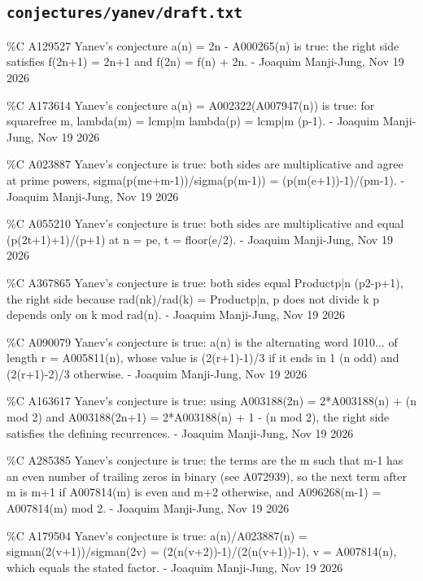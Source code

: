 \subsection*{\texttt{conjectures/yanev/draft.txt}}
{\small\raggedright\ttfamily
\%C A129527 Yanev's conjecture a(n) = 2n - A000265(n) is true: the right side satisfies f(2n+1) = 2n+1 and f(2n) = f(n) + 2n. - Joaquim Manji-Jung, Nov 19 2026\par
\%C A173614 Yanev's conjecture a(n) = A002322(A007947(n)) is true: for squarefree m, lambda(m) = lcmp|m lambda(p) = lcmp|m (p-1). - Joaquim Manji-Jung, Nov 19 2026\par
\%C A023887 Yanev's conjecture is true: both sides are multiplicative and agree at prime powers, sigma(p(me+m-1))/sigma(p(m-1)) = (p(m(e+1))-1)/(pm-1). - Joaquim Manji-Jung, Nov 19 2026\par
\%C A055210 Yanev's conjecture is true: both sides are multiplicative and equal (p(2t+1)+1)/(p+1) at n = pe, t = floor(e/2). - Joaquim Manji-Jung, Nov 19 2026\par
\%C A367865 Yanev's conjecture is true: both sides equal Productp|n (p2-p+1), the right side because rad(nk)/rad(k) = Productp|n, p does not divide k p depends only on k mod rad(n). - Joaquim Manji-Jung, Nov 19 2026\par
\%C A090079 Yanev's conjecture is true: a(n) is the alternating word 1010... of length r = A005811(n), whose value is (2(r+1)-1)/3 if it ends in 1 (n odd) and (2(r+1)-2)/3 otherwise. - Joaquim Manji-Jung, Nov 19 2026\par
\%C A163617 Yanev's conjecture is true: using A003188(2n) = 2*A003188(n) + (n mod 2) and A003188(2n+1) = 2*A003188(n) + 1 - (n mod 2), the right side satisfies the defining recurrences. - Joaquim Manji-Jung, Nov 19 2026\par
\%C A285385 Yanev's conjecture is true: the terms are the m such that m-1 has an even number of trailing zeros in binary (see A072939), so the next term after m is m+1 if A007814(m) is even and m+2 otherwise, and A096268(m-1) = A007814(m) mod 2. - Joaquim Manji-Jung, Nov 19 2026\par
\%C A179504 Yanev's conjecture is true: a(n)/A023887(n) = sigman(2(v+1))/sigman(2v) = (2(n(v+2))-1)/(2(n(v+1))-1), v = A007814(n), which equals the stated factor. - Joaquim Manji-Jung, Nov 19 2026\par
}
